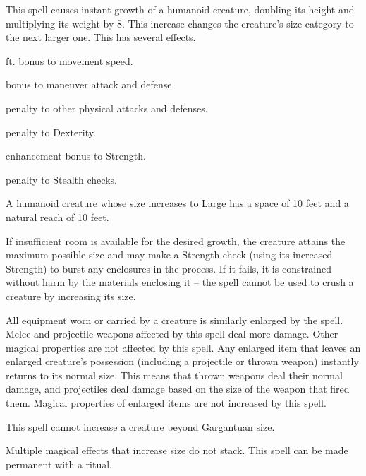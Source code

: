 \spelldur{\durshort \dismissable}
\begin{spelleffect}
    This spell causes instant growth of a humanoid creature, doubling its height and multiplying its weight by 8. This increase changes the creature's size category to the next larger one. This has several effects.
    \begin{itemize*} 
        \item {} ft. bonus to movement speed.
        \item {} bonus to maneuver attack and defense.
        \item {} penalty to other physical attacks and defenses.
        \item {} penalty to Dexterity.
        \item {} enhancement bonus to Strength.
        \item {} penalty to Stealth checks.
    \end{itemize*}
    \par A humanoid creature whose size increases to Large has a space of 10 feet and a natural reach of 10 feet.
    \par If insufficient room is available for the desired growth, the creature attains the maximum possible size and may make a Strength check (using its increased Strength) to burst any enclosures in the process. If it fails, it is constrained without harm by the materials enclosing it -- the spell cannot be used to crush a creature by increasing its size.
    \par All equipment worn or carried by a creature is similarly enlarged by the spell. Melee and projectile weapons affected by this spell deal more damage. Other magical properties are not affected by this spell. Any enlarged item that leaves an enlarged creature's possession (including a projectile or thrown weapon) instantly returns to its normal size. This means that thrown weapons deal their normal damage, and projectiles deal damage based on the size of the weapon that fired them. Magical properties of enlarged items are not increased by this spell.
    \par This spell cannot increase a creature beyond Gargantuan size.
\end{spelleffect}
\begin{spellnotes}
    Multiple magical effects that increase size do not stack. This spell can be made permanent with a  ritual.
\end{spellnotes}

